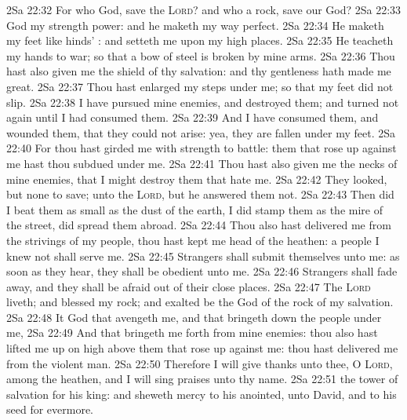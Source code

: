 \vs 2Sa 22:32 For who  God, save the \textsc{Lord}? and who  a rock, save our God?
\vs 2Sa 22:33 God  my strength  power: and he maketh my way perfect.
\vs 2Sa 22:34 He maketh my feet like hinds' : and setteth me upon my high places.
\vs 2Sa 22:35 He teacheth my hands to war; so that a bow of steel is broken by mine arms.
\vs 2Sa 22:36 Thou hast also given me the shield of thy salvation: and thy gentleness hath made me great.
\vs 2Sa 22:37 Thou hast enlarged my steps under me; so that my feet did not slip.
\vs 2Sa 22:38 I have pursued mine enemies, and destroyed them; and turned not again until I had consumed them.
\vs 2Sa 22:39 And I have consumed them, and wounded them, that they could not arise: yea, they are fallen under my feet.
\vs 2Sa 22:40 For thou hast girded me with strength to battle: them that rose up against me hast thou subdued under me.
\vs 2Sa 22:41 Thou hast also given me the necks of mine enemies, that I might destroy them that hate me.
\vs 2Sa 22:42 They looked, but  none to save;  unto the \textsc{Lord}, but he answered them not.
\vs 2Sa 22:43 Then did I beat them as small as the dust of the earth, I did stamp them as the mire of the street,  did spread them abroad.
\vs 2Sa 22:44 Thou also hast delivered me from the strivings of my people, thou hast kept me  head of the heathen: a people  I knew not shall serve me.
\vs 2Sa 22:45 Strangers shall submit themselves unto me: as soon as they hear, they shall be obedient unto me.
\vs 2Sa 22:46 Strangers shall fade away, and they shall be afraid out of their close places.
\vs 2Sa 22:47 The \textsc{Lord} liveth; and blessed  my rock; and exalted be the God of the rock of my salvation.
\vs 2Sa 22:48 It  God that avengeth me, and that bringeth down the people under me,
\vs 2Sa 22:49 And that bringeth me forth from mine enemies: thou also hast lifted me up on high above them that rose up against me: thou hast delivered me from the violent man.
\vs 2Sa 22:50 Therefore I will give thanks unto thee, O \textsc{Lord}, among the heathen, and I will sing praises unto thy name.
\vs 2Sa 22:51  the tower of salvation for his king: and sheweth mercy to his anointed, unto David, and to his seed for evermore.
